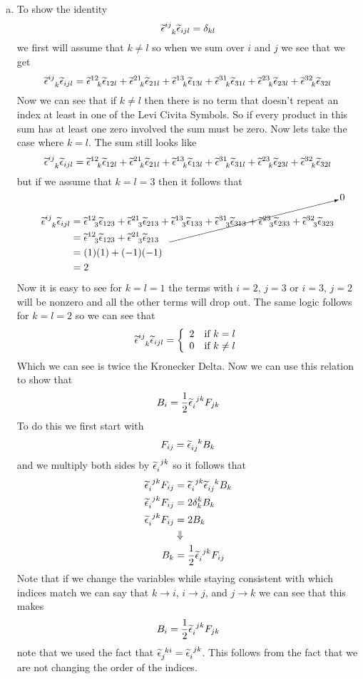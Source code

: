 \documentclass[11pt]{article}
\numberwithin{equation}{section}
\begin{document}
\begin{enumerate}[(a)]
\item
To show the identity 
$$\levi^{ij}_{\ \ k}\levi_{ijl} = \delta_{kl}$$
we first will assume that $k\ne l$ so when we sum over $i$ and $j$ we see that we get 
$$\levi^{ij}_{\ \ k}\levi_{ijl} = \levi^{12}_{\ \ k}\levi_{12l} + \levi^{21}_{\ \ k}\levi_{21l} + \levi^{13}_{\ \ k}\levi_{13l} + \levi^{31}_{\ \ k}\levi_{31l} + \levi^{23}_{\ \ k}\levi_{23l} + \levi^{32}_{\ \ k}\levi_{32l}$$
Now we can see that if $k\ne l$ then there is no term that doesn't repeat an index at least in one of the Levi Civita Symbols. So if every product in this sum has at least one zero involved the sum must be zero. Now lets take the case where $k=l$. The sum still looks like 
$$\levi^{ij}_{\ \ k}\levi_{ijl} = \levi^{12}_{\ \ k}\levi_{12l} + \levi^{21}_{\ \ k}\levi_{21l} + \levi^{13}_{\ \ k}\levi_{13l} + \levi^{31}_{\ \ k}\levi_{31l} + \levi^{23}_{\ \ k}\levi_{23l} + \levi^{32}_{\ \ k}\levi_{32l}$$
but if we assume that $k=l=3$ then it follows that
\begin{align*}
\levi^{ij}_{\ \ k}\levi_{ijl} &= \levi^{12}_{\ \ 3}\levi_{123} + \levi^{21}_{\ \ 3}\levi_{213} + \cancelto{0}{\levi^{13}_{\ \ 3}\levi_{133} + \levi^{31}_{\ \ 3}\levi_{313} + \levi^{23}_{\ \ 3}\levi_{233} + \levi^{32}_{\ \ 3}\levi_{323}}\\
 &= \levi^{12}_{\ \ 3}\levi_{123} + \levi^{21}_{\ \ 3}\levi_{213}\\
 &= (1)(1) + (-1)(-1) \\
&= 2
\end{align*}
Now it is easy to see for $k=l=1$ the terms with $i=2$, $j=3$ or $i=3$, $j=2$ will be nonzero and all the other terms will drop out. The same logic follows for $k=l=2$ so we can see that
$$\levi^{ij}_{\ \ k}\levi_{ijl} = \left\{\begin{array}{cl}
				2	&\textnormal{if}\ k=l\\
				0	&\textnormal{if}\ k\ne l
				\end{array}\right.$$
Which we can see is twice the Kronecker Delta. Now we can use this relation to show that 
$$B_i = \frac{1}{2}\widetilde{\epsilon}_{i}^{\ jk}F_{jk}$$
To do this we first start with 
$$F_{ij} = \widetilde{\epsilon}_{ij}^{\ \ k}B_k$$
and we multiply both sides by $\widetilde{\epsilon}_{i}^{\ jk}$ so it follows that
\begin{align*}
\widetilde{\epsilon}_{i}^{\ jk}F_{ij} &=\widetilde{\epsilon}_{i}^{\ jk} \widetilde{\epsilon}_{ij}^{\ \ k}B_k\\
\widetilde{\epsilon}_{i}^{\ jk}F_{ij} &=2\delta_{k}^{k}B_k\\
\widetilde{\epsilon}_{i}^{\ jk}F_{ij} &=2B_k\\
&\Downarrow\\
B_k &= \frac{1}{2}\widetilde{\epsilon}_{i}^{\ jk}F_{ij}
\end{align*}
Note that if we change the variables while staying consistent with which indices match we can say that $k\rightarrow i$, $i\rightarrow j$, and $j\rightarrow k$ we can see that this makes 
$$B_i = \frac{1}{2}\widetilde{\epsilon}_{i}^{\ jk}F_{jk}$$
note that we used the fact that $\levi_{j}^{\ ki} = \levi_{i}^{\ jk}$. This follows from the fact that we are not changing the order of the indices.


\end{enumerate}
\end{document}
